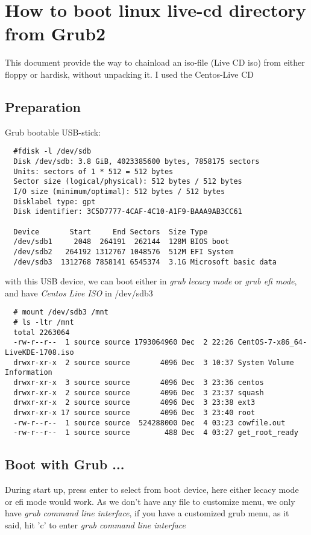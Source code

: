 \chapter{How to boot linux live-cd directory from Grub2}
This document provide the way to chainload an iso-file (Live CD iso) from either floppy or hardisk, without unpacking it. I used the Centos-Live CD

\section{Preparation}

Grub bootable USB-stick:
\begin{lstlisting}
  #fdisk -l /dev/sdb
  Disk /dev/sdb: 3.8 GiB, 4023385600 bytes, 7858175 sectors
  Units: sectors of 1 * 512 = 512 bytes
  Sector size (logical/physical): 512 bytes / 512 bytes
  I/O size (minimum/optimal): 512 bytes / 512 bytes
  Disklabel type: gpt
  Disk identifier: 3C5D7777-4CAF-4C10-A1F9-BAAA9AB3CC61

  Device       Start     End Sectors  Size Type
  /dev/sdb1     2048  264191  262144  128M BIOS boot
  /dev/sdb2   264192 1312767 1048576  512M EFI System
  /dev/sdb3  1312768 7858141 6545374  3.1G Microsoft basic data
\end{lstlisting}

with this USB device, we can boot either in \emph{grub lecacy mode} or \emph{grub efi mode}, and have \emph{Centos Live ISO} in {\ttfamily /dev/sdb3}

\begin{lstlisting}
  # mount /dev/sdb3 /mnt
  # ls -ltr /mnt
  total 2263064
  -rw-r--r--  1 source source 1793064960 Dec  2 22:26 CentOS-7-x86_64-LiveKDE-1708.iso
  drwxr-xr-x  2 source source       4096 Dec  3 10:37 System Volume Information
  drwxr-xr-x  3 source source       4096 Dec  3 23:36 centos
  drwxr-xr-x  2 source source       4096 Dec  3 23:37 squash
  drwxr-xr-x  2 source source       4096 Dec  3 23:38 ext3
  drwxr-xr-x 17 source source       4096 Dec  3 23:40 root
  -rw-r--r--  1 source source  524288000 Dec  4 03:23 cowfile.out
  -rw-r--r--  1 source source        488 Dec  4 03:27 get_root_ready
\end{lstlisting}


\section{Boot with Grub ...}
During start up, press enter to select from boot device, here either lecacy mode or efi mode would work. As we don't have any  file to customize menu, we only have \emph{grub command line interface}, if you have a customized grub menu, as it said, hit 'c' to enter \emph{grub command line interface}


